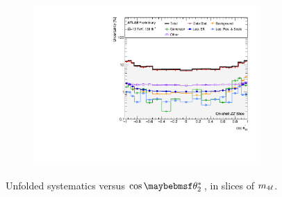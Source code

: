 \begin{figure}[hp]
    \begin{subfigure}{.49\textwidth}\centering\includegraphics[width = 0.95\textwidth]{Figures/m4l/Systematics/Unfolded/UnfoldedSys_CTS34_vs_M4l_Stack_Paper3.pdf}\end{subfigure}
    \caption{Unfolded systematics versus $\costhetastar_{2}$, in slices of $m_{4\ell}$.}
\end{figure}

